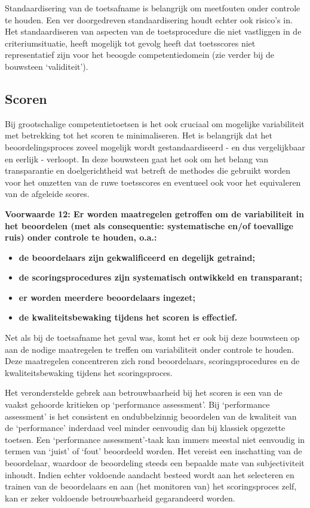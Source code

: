 \documentclass[
  letterpaper,
]{report}
\providecommand{\tightlist}{%
  \setlength{\itemsep}{0pt}\setlength{\parskip}{0pt}}
\begin{document}
Standaardisering van de toetsafname is belangrijk om meetfouten onder
controle te houden. Een ver doorgedreven standaardisering houdt echter
ook risico's in. Het standaardiseren van aspecten van de toetsprocedure
die niet vastliggen in de criteriumsituatie, heeft mogelijk tot gevolg
heeft dat toetsscores niet representatief zijn voor het beoogde
competentiedomein (zie verder bij de bouwsteen `validiteit').

\hypertarget{scoren}{%
\subsection{Scoren}\label{scoren}}

Bij grootschalige competentietoetsen is het ook cruciaal om mogelijke
variabiliteit met betrekking tot het scoren te minimaliseren. Het is
belangrijk dat het beoordelingsproces zoveel mogelijk wordt
gestandaardiseerd - en dus vergelijkbaar en eerlijk - verloopt. In deze
bouwsteen gaat het ook om het belang van transparantie en
doelgerichtheid wat betreft de methodes die gebruikt worden voor het
omzetten van de ruwe toetsscores en eventueel ook voor het equivaleren
van de afgeleide scores.

\textbf{Voorwaarde 12: Er worden maatregelen getroffen om de
variabiliteit in het beoordelen (met als consequentie: systematische
en/of toevallige ruis) onder controle te houden, o.a.:}

\begin{itemize}
\tightlist
\item
  \textbf{de beoordelaars zijn gekwalificeerd en degelijk getraind;}
\item
  \textbf{de scoringsprocedures zijn systematisch ontwikkeld en
  transparant;}
\item
  \textbf{er worden meerdere beoordelaars ingezet;}
\item
  \textbf{de kwaliteitsbewaking tijdens het scoren is effectief.}
\end{itemize}

Net als bij de toetsafname het geval was, komt het er ook bij deze
bouwsteen op aan de nodige maatregelen te treffen om variabiliteit onder
controle te houden. Deze maatregelen concentreren zich rond
beoordelaars, scoringsprocedures en de kwaliteitsbewaking tijdens het
scoringsproces.

Het veronderstelde gebrek aan betrouwbaarheid bij het scoren is een van
de vaakst gehoorde kritieken op `performance assessment'. Bij
`performance assessment' is het consistent en ondubbelzinnig beoordelen
van de kwaliteit van de `performance' inderdaad veel minder eenvoudig
dan bij klassiek opgezette toetsen. Een `performance assessment'-taak
kan immers meestal niet eenvoudig in termen van `juist' of `fout'
beoordeeld worden. Het vereist een inschatting van de beoordelaar,
waardoor de beoordeling steeds een bepaalde mate van subjectiviteit
inhoudt. Indien echter voldoende aandacht besteed wordt aan het
selecteren en trainen van de beoordelaars en aan (het monitoren van) het
scoringsproces zelf, kan er zeker voldoende betrouwbaarheid gegarandeerd
worden.
\end{document}

